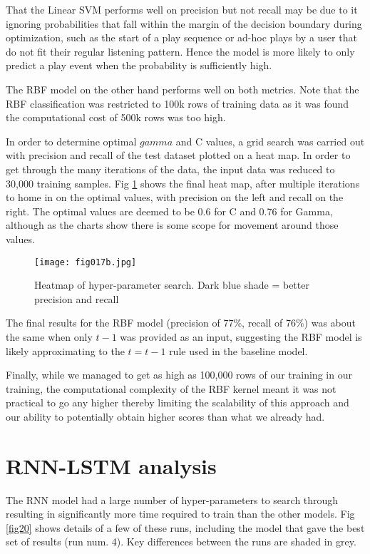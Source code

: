 That the Linear SVM performs well on precision but not recall may be due to it ignoring probabilities that fall within the margin of the decision boundary during optimization, such as the start of a play sequence or ad-hoc plays by a user that do not fit their regular listening pattern. Hence the model is more likely to only predict a play event when the probability is sufficiently high.

The RBF model on the other hand performs well on both metrics. Note that the RBF classification was restricted to 100k rows of training data as it was found the computational cost of 500k rows was too high. 

In order to determine optimal $gamma$ and C values, a grid search was carried out with precision and recall of the test dataset plotted on a heat map. In order to get through the many iterations of the data, the input data was reduced to 30,000 training samples. Fig \ref{fig17b} shows the final heat map, after multiple iterations to home in on the optimal values, with precision on the left and recall on the right. The optimal values are deemed to be 0.6 for C and 0.76 for Gamma, although as the charts show there is some scope for movement around those values.

\begin{figure}[h!]
	\centering
	\texttt{[image: fig017b.jpg]}
	\caption{Heatmap of hyper-parameter search. Dark blue shade = better precision and recall}
	\label{fig17b}
\end{figure} 

The final results for the RBF model (precision of 77\%, recall of 76\%) was about the same when only $t-1$ was provided as an input, suggesting the RBF model is likely approximating to the $t=t-1$ rule used in the baseline model.

Finally, while we managed to get as high as 100,000 rows of our training in our training, the computational complexity of the RBF kernel meant it was not practical to go any higher thereby limiting the scalability of this approach and our ability to potentially obtain higher scores than what we already had.

\newpage

\section{RNN-LSTM analysis}

The RNN model had a large number of hyper-parameters to search through resulting in significantly more time required to train than the other models. Fig \ref{fig20} shows details of a few of these runs, including the model that gave the best set of results (run num. 4). Key differences between the runs are shaded in grey.

